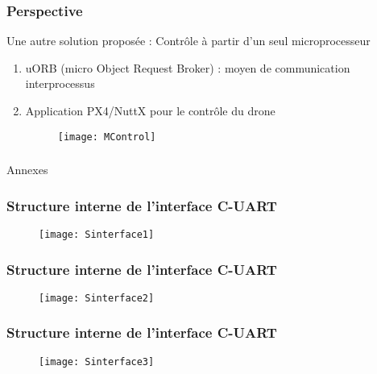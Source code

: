 \documentclass{beamer}
\begin{document}
\begin{frame}
\frametitle{Perspective}


Une autre solution propos\'ee : Contr\^ole \`a partir d'un seul microprocesseur
\begin{enumerate}

\item uORB (micro Object Request Broker) : moyen de communication interprocessus
\item Application PX4/NuttX pour le contr\^ole du drone 
	\begin{figure}
	
		\texttt{[image: MControl]}
	
	\end{figure}

\end{enumerate}

\end{frame}


\begin{frame}

	\frametitle{}

	\Huge{\centerline{Annexes}}

\end{frame}

\begin{frame}

	\frametitle{Structure interne de l'interface C-UART}

	\begin{figure}

		\texttt{[image: Sinterface1]}

	\end{figure}

\end{frame}

\begin{frame}

	\frametitle{Structure interne de l'interface C-UART}
	
	\begin{figure}

		\texttt{[image: Sinterface2]}

	\end{figure}

\end{frame}

\begin{frame}

	\frametitle{Structure interne de l'interface C-UART}

	\begin{figure}
	
		\texttt{[image: Sinterface3]}
	
	\end{figure}

\end{frame}
\end{document}
